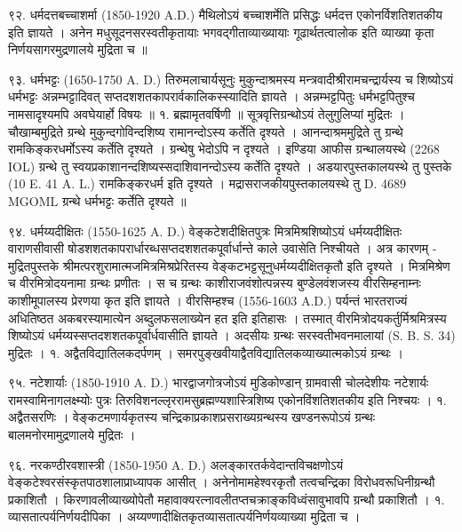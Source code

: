 ९२. धर्मदत्तबच्चाशर्मा (1850-1920 A.D.)
मैथिलोऽयं बच्चाशर्मेति प्रसिद्धः धर्मदत्त एकोनर्विशतिशतकीय इति ज्ञायते । अनेन मधुसूदनसरस्वतीकृतायाः भगवद्गीताव्याख्यायाः गूढार्थतत्वालोक इति व्याख्या कृता निर्णयसागरमुद्रणालये मुद्रिता च ॥

९३. धर्मभट्टः (1650-1750 A. D.)
तिरुमलाचार्यसूनुः मुकुन्दाश्रमस्य मन्त्रवादीश्रीरामचन्द्रार्यस्य च शिष्योऽयं धर्मभट्टः अन्नम्भट्टादिवत् सप्तदशशतकापरार्वकालिकस्स्यादिति ज्ञायते । अन्नम्भट्टपितुः धर्मभट्टपितुश्च नामसादृश्यमपि अवघेयार्हो विषयः ॥
१. ब्रह्मामृतवर्षिणी ॥ सूत्रवृत्तिग्रन्थोऽयं तेलुगुलिप्यां मुद्रितः । चौखाम्बमुद्रिते ग्रन्थे मुकुन्दगोविन्दशिष्य रामानन्दोऽस्य कर्तेति दृश्यते । आनन्दाश्रममुद्रिते तु ग्रन्थे रामकिङ्करधर्मोऽस्य कर्तेति दृश्यते । ग्रन्थेषु भेदोऽपि न दृश्यते । इण्डिया आफीस ग्रन्थालयस्थे (2268 IOL) ग्रन्थे तु स्वयप्रकाशानन्दशिष्यस्सदाशिवानन्दोऽस्य कर्तेति दृश्यते । अडयारपुस्तकालयस्थे तु पुस्तके (10 E. 41 A. L.) रामकिङ्करधर्म इति दृश्यते । मद्रासराजकीयपुस्तकालयस्थे तु D. 4689 MGOML ग्रन्थे धर्मभट्टः कर्तेति दृश्यते ॥

९४. धर्मय्यदीक्षितः (1550-1625 A. D.)
वेङ्कटेशदीक्षितपुत्रः मित्रमिश्रशिष्योऽयं धर्मय्यदीक्षितः वाराणसीवासी षोडशशतकापरार्धारब्धसप्तदशशतकपूर्वार्धान्ते काले उवासेति निश्चीयते । अत्र कारणम् - मुद्रितपुस्तके श्रीमत्परशुरामात्मजमित्रमिश्रप्रेरितस्य वेङ्कटभट्टसूनुधर्मय्यदीक्षितकृतौ इति दृश्यते । मित्रमिश्रेण च वीरमित्रोदयनामा ग्रन्थः प्रणीतः । स च ग्रन्थः काशीराजवंशोत्पन्नस्य बुण्डेलवंशजस्य वीरसिम्हनाम्नः काशीमूपालस्य प्रेरणया कृत इति ज्ञायते । वीरसिम्हश्च (1556-1603 A.D.) पर्यन्तं भारतराज्यं अधितिष्ठत अकबरस्यामात्येन अब्दुलफसलाख्येन हत इति इतिहासः । तस्मात् वीरमित्रोदयकर्तुर्मिश्रमित्रस्य शिष्योऽयं धर्मय्यस्सप्तदशशतकपूर्वार्धवासीति ज्ञायते । अदसीयः ग्रन्थः सरस्वतीभवनमालायां (S. B. S. 34) मुद्रितः ।
१. अद्वैतविद्यातिलकदर्पणम् ।  समरपुङ्खवीयाद्वैतविद्यातिलकव्याख्यात्मकोऽयं ग्रन्थः ।

९५. नटेशार्याः (1850-1910 A. D.)
भारद्वाजगोत्रजोऽयं मुडिकोण्डान् ग्रामवासी चोलदेशीयः नटेशार्यः रामस्वामिनागलक्ष्म्योः पुत्रः तिरुविशनल्लृररामसुब्रह्मण्यशास्त्रिशिष्य एकोनविंशतिशतकीय इति निश्चयः । 
१. अद्वैतसरणिः । वेङ्कटमणार्यकृतस्य चन्द्रिकाप्रकाशप्रसराख्यग्रन्थस्य खण्डनरूपोऽयं ग्रन्थः बालमनोरमामुद्रणालये मुद्रितः ।

९६. नरकण्ठीरवशास्त्री (1850-1950 A. D.)
अलङ्कारतर्कवेदान्तविचक्षणोऽयं वेङ्कटेश्वरसंस्कृतपाठशालाप्राध्यापक आसीत् । अनेनोमामहेश्वरकृतौ तत्वचन्द्रिका विरोधवरूधिनीग्रन्थौ प्रकाशितौ । किरणावलीव्याख्योपेतौ महावाक्यरत्नावलीतप्तचक्राङ्कविध्वंसावुभावपि ग्रन्थौ प्रकाशितौ ।
१. व्यासतात्पर्यनिर्णयदीपिका । अय्यण्णादीक्षितकृतव्यासतात्पर्यनिर्णयव्याख्या मुद्रिता च ।

